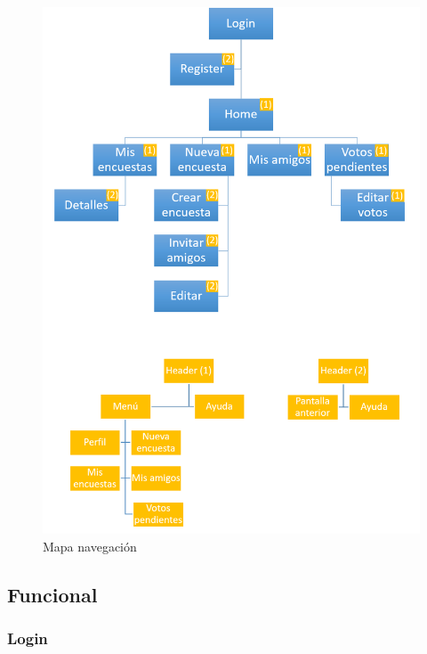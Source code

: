 \documentclass[a4paper, 12pt]{book}
\begin{document}
\begin{figure}[H]
  \centering
  \includegraphics[width=15cm, keepaspectratio]{img/mapa_navegacion.png}
  \caption{Mapa navegaci\'on}
  \label{figura:mapa_navegacion}
\end{figure}




\subsection{Funcional}
\label{sec:funcional}

\subsubsection{Login}
\label{sec:login}
\end{document}

